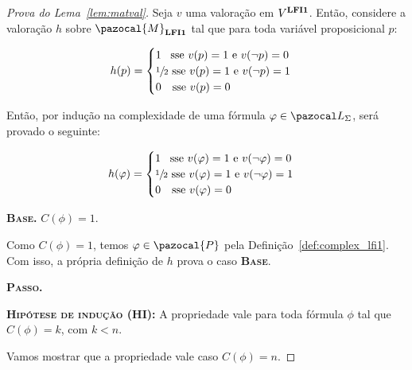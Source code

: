     \begin{proof}[Prova do Lema~\ref{lem:matval}]
        Seja $v$ uma valoração em $V^{{\normalfont\textbf{LFI1}}}$. Então, considere a valoração $h$ sobre $\pazocal{M}_{\lfium}$ tal que para toda variável proposicional $p$:
        \begin{center}
            \begin{equation*}
                h(p) =
                \begin{cases}
                  1\ \, \text{ sse } v(p) = 1 \text{ e } v(\neg p) = 0 \\
                  \sfrac{1}{2}{} \text{ sse } v(p) = 1 \text{ e } v(\neg p) = 1 \\
                  0\ \ \text{ sse } v(p) = 0
                \end{cases}
              \end{equation*}
        \end{center}

        Então, por indução na complexidade de uma fórmula $\phi \in \ling{}$, será provado o seguinte:
        \begin{center}
            \begin{equation*}
                h(\varphi) =
                \begin{cases}
                  1\ \,  \text{ sse } v(\varphi) = 1 \text{ e } v(\neg \varphi) = 0 \\
                  \sfrac{1}{2}{} \text{ sse } v(\varphi) = 1 \text{ e } v(\neg \varphi) = 1 \\
                  0\ \  \text{ sse } v(\varphi) = 0
                \end{cases}
              \end{equation*}
        \end{center}

        \noindent \textbf{\textsc{Base.}} $C(\phi) = 1$.

        Como $C(\phi) = 1$, temos $\phi \in \pazocal{P}$ pela Definição~\ref{def:complex_lfi1}. Com isso, a própria definição de $h$ prova o caso \textbf{\textsc{Base}}.

        
        \noindent \textbf{\textsc{Passo.}} 

        \noindent \textbf{\textsc{Hipótese de indução (HI):}} A propriedade vale para toda fórmula $\phi$ tal que $C(\phi) = k$, com $k < n$.

        Vamos mostrar que a propriedade vale caso $C(\phi) = n$.


\end{proof}
